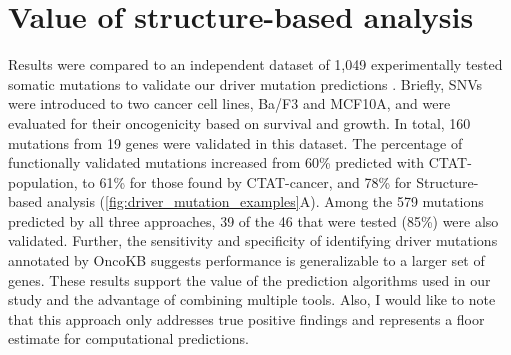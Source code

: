 \section{Value of structure-based analysis}

Results were compared to an independent dataset of 1,049 experimentally tested somatic mutations to validate our driver mutation predictions \cite{RN187}. Briefly, SNVs were introduced to two cancer cell lines, Ba/F3 and MCF10A, and were evaluated for their oncogenicity based on survival and growth. In total, 160 mutations from 19 genes were validated in this dataset. The percentage of functionally validated mutations increased from 60\% predicted with CTAT-population, to 61\% for those found by CTAT-cancer, and 78\% for Structure-based analysis (\autoref{fig:driver_mutation_examples}A). Among the 579 mutations predicted by all three approaches, 39 of the 46 that were tested (85\%) were also validated. Further, the sensitivity and specificity of identifying driver mutations annotated by OncoKB suggests performance is generalizable to a larger set of genes. These results support the value of the prediction algorithms used in our study and the advantage of combining multiple tools. Also, I would like to note that this approach only addresses true positive findings and represents a floor estimate for computational predictions.

